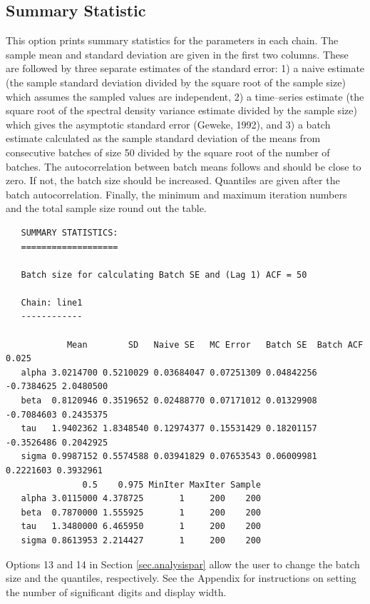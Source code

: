 \documentclass[12pt,letterpaper]{report}
\begin{document}
\subsection{Summary Statistic}
\noindent
This option prints summary statistics for the parameters in each chain. The
sample mean and standard deviation are given in the first two columns. These are
followed by three separate estimates of the standard error: 1) a naive estimate
(the sample standard deviation divided by the square root of the sample size)
which assumes the sampled values are independent, 2) a time--series estimate
(the square root of the spectral density variance estimate divided by the sample
size) which gives the asymptotic standard error (Geweke, 1992), and 3) a batch
estimate calculated as the sample standard deviation of the means from
consecutive batches of size 50 divided by the square root of the number of
batches. The autocorrelation between batch means follows and should be close to
zero. If not, the batch size should be increased. Quantiles are given after the
batch autocorrelation. Finally, the minimum and maximum iteration numbers and
the total sample size round out the table.
\vskip 9pt
\begin{tiny}
\begin{verbatim}
   SUMMARY STATISTICS:
   ===================

   Batch size for calculating Batch SE and (Lag 1) ACF = 50

   Chain: line1
   ------------

            Mean        SD   Naive SE   MC Error   Batch SE  Batch ACF     0.025
   alpha 3.0214700 0.5210029 0.03684047 0.07251309 0.04842256 -0.7384625 2.0480500
   beta  0.8120946 0.3519652 0.02488770 0.07171012 0.01329908 -0.7084603 0.2435375
   tau   1.9402362 1.8348540 0.12974377 0.15531429 0.18201157 -0.3526486 0.2042925
   sigma 0.9987152 0.5574588 0.03941829 0.07653543 0.06009981  0.2221603 0.3932961
               0.5    0.975 MinIter MaxIter Sample
   alpha 3.0115000 4.378725       1     200    200
   beta  0.7870000 1.555925       1     200    200
   tau   1.3480000 6.465950       1     200    200
   sigma 0.8613953 2.214427       1     200    200
\end{verbatim}
\end{tiny}
Options 13 and 14 in Section \ref{sec.analysispar} allow the user to change
the batch size and the quantiles, respectively.  See the Appendix for
instructions on setting the number of significant digits and display width.
\end{document}
